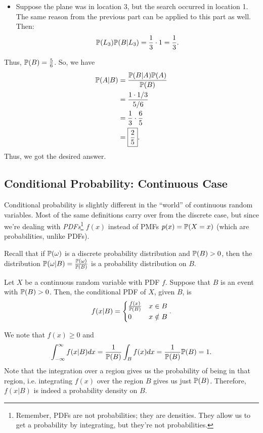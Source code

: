 \begin{mdframed}[]
\begin{mdframed}[]
\begin{itemize}
            \item Suppose the plane was in location 3, but the search occurred in location 1. The same reason from the previous part can be applied to this part as well. Then:
            \[\mathbb{P}(L_3) \mathbb{P}(B|L_3) = \frac{1}{3} \cdot 1 = \frac{1}{3}.\]
        \end{itemize}
        Thus, $\mathbb{P}(B) = \frac{5}{6}$. So, we have 
        \begin{equation*}
            \begin{aligned}
                \mathbb{P}(A|B) &= \frac{\mathbb{P}(B | A) \mathbb{P}(A)}{\mathbb{P}(B)} \\ 
                    &= \frac{1 \cdot 1/3}{5/6} \\ 
                    &= \frac{1}{3} \cdot \frac{6}{5} \\ 
                    &= \boxed{\frac{2}{5}}.
            \end{aligned}
        \end{equation*}
        Thus, we got the desired answer.
    \end{mdframed}
\end{mdframed}



\subsection{Conditional Probability: Continuous Case}
Conditional probability is slightly different in the ``world'' of continuous random variables. Most of the same definitions carry over from the discrete case, but since we're dealing with \emph{PDFs}\footnote{Remember, PDFs are not probabilities; they are densities. They allow us to get a probability by integrating, but they're not probabilities.} $f(x)$ instead of PMFs $p(x) = \mathbb{P}(X = x)$ (which are probabilities, unlike PDFs).

\bigskip 

Recall that if $\mathbb{P}(\omega)$ is a discrete probability distribution and $\mathbb{P}(B) > 0$, then the distribution $\mathbb{P}(\omega | B) = \frac{\mathbb{P}(\omega)}{\mathbb{P}(B)}$ is a probability distribution on $B$.
\begin{definition}{}{}
    Let $X$ be a continuous random variable with PDF $f$. Suppose that $B$ is an event with $\mathbb{P}(B) > 0$. Then, the conditional PDF of $X$, given $B$, is 
    \[f(x | B) = \begin{cases}
        \frac{f(x)}{\mathbb{P}(B)} & x \in B \\ 
        0 & x \notin B
    \end{cases}.\]
\end{definition}
We note that $f(x) \geq 0$ and 
\[\int_{-\infty}^{\infty} f(x | B) dx = \frac{1}{\mathbb{P}(B)} \int_{B} f(x) dx = \frac{1}{\mathbb{P}(B)} \mathbb{P}(B) = 1.\]
Note that the integration over a region gives us the probability of being in that region, i.e. integrating $f(x)$ over the region $B$ gives us just $\mathbb{P}(B)$. Therefore, $f(x | B)$ is indeed a probability density on $B$. 

